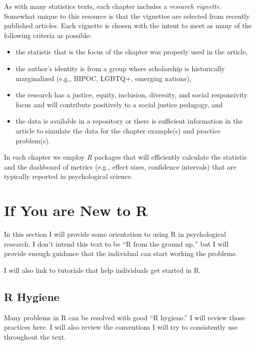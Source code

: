 \documentclass[
  english,
]{book}
\providecommand{\tightlist}{%
  \setlength{\itemsep}{0pt}\setlength{\parskip}{0pt}}
\begin{document}
As with many statistics texts, each chapter includes a \emph{research vignette.} Somewhat unique to this resource is that the vignettes are selected from recently published articles. Each vignette is chosen with the intent to meet as many of the following criteria as possible:

\begin{itemize}
\tightlist
\item
  the statistic that is the focus of the chapter was properly used in the article,
\item
  the author's identity is from a group where scholarship is historically marginalized (e.g., BIPOC, LGBTQ+, emerging nations),
\item
  the research has a justice, equity, inclusion, diversity, and social responsivity focus and will contribute positively to a social justice pedagogy, and
\item
  the data is available in a repository or there is sufficient information in the article to simulate the data for the chapter example(s) and practice problem(s).
\end{itemize}

In each chapter we employ \emph{R} packages that will efficiently calculate the statistic and the dashboard of metrics (e.g., effect sizes, confidence intervals) that are typically reported in psychological science.

\hypertarget{if-you-are-new-to-r}{%
\section{If You are New to R}\label{if-you-are-new-to-r}}

In this section I will provide some orientation to using R in psychological research. I don't intend this text to be ``R from the ground up,'' but I will provide enough guidance that the individual can start working the problems.

I will also link to tutorials that help individuals get started in R.

\hypertarget{r-hygiene}{%
\subsection{R Hygiene}\label{r-hygiene}}

Many problems in R can be resolved with good ``R hygiene.'' I will review those practices here. I will also review the conventions I will try to consistently use throughout the text.
\end{document}
